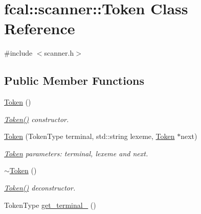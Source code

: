 \hypertarget{classfcal_1_1scanner_1_1Token}{}\section{fcal\+:\+:scanner\+:\+:Token Class Reference}
\label{classfcal_1_1scanner_1_1Token}


{\ttfamily \#include $<$scanner.\+h$>$}

\subsection*{Public Member Functions}
\begin{DoxyCompactItemize}
\item 
\hyperlink{classfcal_1_1scanner_1_1Token_a7c1dcd4c5a9c6ea04470ab2da0b7e4d3}{Token} ()\hypertarget{classfcal_1_1scanner_1_1Token_a7c1dcd4c5a9c6ea04470ab2da0b7e4d3}{}\label{classfcal_1_1scanner_1_1Token_a7c1dcd4c5a9c6ea04470ab2da0b7e4d3}

\begin{DoxyCompactList}\small\item\em \hyperlink{classfcal_1_1scanner_1_1Token_a7c1dcd4c5a9c6ea04470ab2da0b7e4d3}{Token()} constructor. \end{DoxyCompactList}\item 
\hyperlink{classfcal_1_1scanner_1_1Token_a185c60506f8a059cac4ef1df9e2ed38a}{Token} (Token\+Type terminal, std\+::string lexeme, \hyperlink{classfcal_1_1scanner_1_1Token}{Token} $\ast$next)\hypertarget{classfcal_1_1scanner_1_1Token_a185c60506f8a059cac4ef1df9e2ed38a}{}\label{classfcal_1_1scanner_1_1Token_a185c60506f8a059cac4ef1df9e2ed38a}

\begin{DoxyCompactList}\small\item\em \hyperlink{classfcal_1_1scanner_1_1Token}{Token} parameters\+: terminal, lexeme and next. \end{DoxyCompactList}\item 
\hyperlink{classfcal_1_1scanner_1_1Token_a6979a10e31af36531d793584215ea86f}{$\sim$\+Token} ()\hypertarget{classfcal_1_1scanner_1_1Token_a6979a10e31af36531d793584215ea86f}{}\label{classfcal_1_1scanner_1_1Token_a6979a10e31af36531d793584215ea86f}

\begin{DoxyCompactList}\small\item\em \hyperlink{classfcal_1_1scanner_1_1Token_a7c1dcd4c5a9c6ea04470ab2da0b7e4d3}{Token()} deconstructor. \end{DoxyCompactList}\item 
Token\+Type \hyperlink{classfcal_1_1scanner_1_1Token_a85ab32e4c9f749421c7ef3fd54fb38cb}{get\+\_\+terminal\+\_\+} ()\hypertarget{classfcal_1_1scanner_1_1Token_a85ab32e4c9f749421c7ef3fd54fb38cb}{}\label{classfcal_1_1scanner_1_1Token_a85ab32e4c9f749421c7ef3fd54fb38cb}


\end{DoxyCompactItemize}
